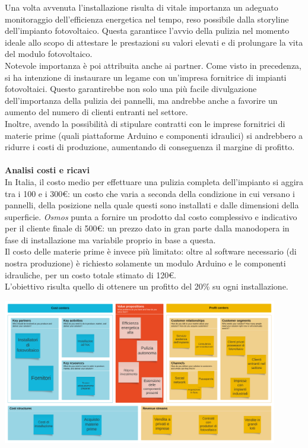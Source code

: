\documentclass[a4paper, 12pt]{article}
\begin{document}
	Una volta avvenuta l'installazione risulta di vitale importanza un adeguato monitoraggio dell'efficienza energetica nel tempo, reso possibile dalla storyline dell'impianto fotovoltaico. Questa garantisce l'avvio della pulizia nel momento ideale allo scopo di attestare le prestazioni su valori elevati e di prolungare la vita del modulo fotovoltaico.\\
	Notevole importanza è poi attribuita anche ai partner. Come visto in precedenza, si ha intenzione di instaurare un legame con un'impresa fornitrice di impianti fotovoltaici. Questo garantirebbe non solo una più facile divulgazione dell'importanza della pulizia dei pannelli, ma andrebbe anche a favorire un aumento del numero di clienti entranti nel settore.\\ %
	Inoltre, avendo la possibilità di stipulare contratti con le imprese fornitrici di materie prime (quali piattaforme Arduino e componenti idraulici) si andrebbero a ridurre i costi di produzione, aumentando di conseguenza il margine di profitto.\\\\
	\textbf{Analisi costi e ricavi}\\
	In Italia, il costo medio per effettuare una pulizia completa dell'impianto si aggira tra i 100 e i 300\euro: un costo che varia a seconda della condizione in cui versano i pannelli, della posizione nella quale questi sono installati e dalle dimensioni della superficie. \emph{Osmos} punta a fornire un prodotto dal costo complessivo e indicativo per il cliente finale di 500\euro: un prezzo dato in gran parte dalla manodopera in fase di installazione ma variabile proprio in base a questa.\\
	Il costo delle materie prime è invece più limitato: oltre al software necessario (di nostra produzione) è richiesto solamente un modulo Arduino e le componenti idrauliche, per un costo totale stimato di 120\euro.\\
	L'obiettivo risulta quello di ottenere un profitto del 20\% su ogni installazione.
	\begin{center}
		\includegraphics[width=0.9\textwidth]{Images/BusinessModelCanvas.png}
	\end{center}
\end{document}
